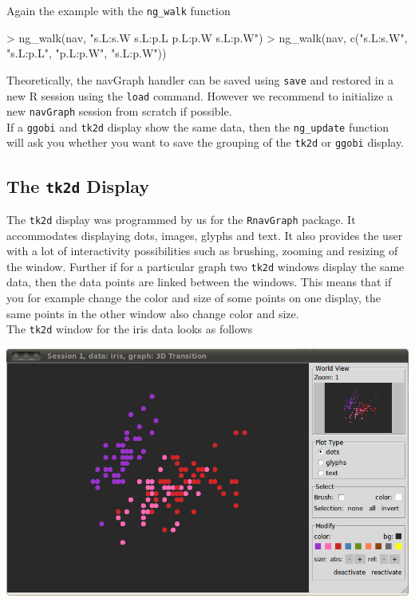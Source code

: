 \documentclass[12pt,oneside,titlepage,letter]{article}
\begin{document}
Again the example with the \texttt{ng\_walk} function

\begin{Schunk}
\begin{Sinput}
> ng_walk(nav, "s.L:s.W s.L:p.L p.L:p.W s.L:p.W")
> ng_walk(nav, c("s.L:s.W", "s.L:p.L", "p.L:p.W", "s.L:p.W"))
\end{Sinput}
\end{Schunk}

Theoretically, the navGraph handler can be saved using \texttt{save} and restored in a new R session using the \texttt{load} command. However we recommend to initialize a new \texttt{navGraph} session from  scratch if possible.\\

If a \texttt{ggobi} and \texttt{tk2d} display show the same data, then the \texttt{ng\_update} function will ask you whether you want to save the grouping of the \texttt{tk2d} or \texttt{ggobi} display.



\subsection{The \texttt{tk2d} Display}
The \texttt{tk2d} display was programmed by us for the \texttt{RnavGraph} package. It accommodates displaying dots, images, glyphs and text. It also provides the user with a lot of interactivity possibilities such as brushing, zooming and resizing of the window. Further if for a particular graph two \texttt{tk2d} windows display the same data, then the data points are linked between the windows. This means that if you for example change the color and size of some points on one display, the same points in the other window also change color and size.\\


The \texttt{tk2d} window for the iris data looks as follows
\begin{center}
  \includegraphics[width = 0.7 \textwidth]{img/Iris2D.png}
\end{center}
\end{document}

